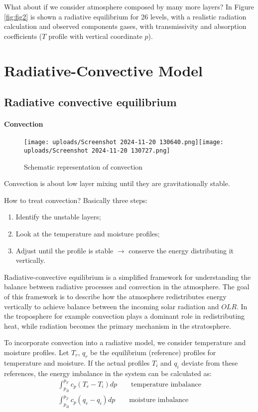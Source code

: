 What about if we consider atmosphere composed by many more layers?
In Figure \ref{fig:fig2} is shown a radiative equilibrium for 26 levels, with a realistic radiation calculation and observed components gases, with transmissivity and absorption coefficients ($T$ profile with vertical coordinate $p$).

\section{Radiative-Convective Model}
\subsection{Radiative convective equilibrium}\label{subsec:convection adjustments}
\paragraph{Convection}
\begin{figure}[htpb]
	\centering
	\texttt{[image: uploads/Screenshot 2024-11-20 130640.png]}\quad \texttt{[image: uploads/Screenshot 2024-11-20 130727.png]}
	\caption{Schematic representation of convection}

\end{figure}
Convection is about low layer mixing until they are gravitationally stable.

How to treat convection? Basically three steps:
\begin{enumerate}
	\item Identify the unstable layers;
	\item Look at the temperature and moisture profiles;
	\item Adjust until the profile is stable $\rightarrow$ conserve the energy distributing it vertically.
\end{enumerate}
Radiative-convective equilibrium is a simplified framework for understanding the balance between radiative processes and convection in the atmosphere. The goal of this framework is to describe how the atmosphere redistributes energy vertically to achieve balance between the incoming solar radiation and $OLR$. In the troposphere for example convection plays a dominant role in redistributing heat, while radiation becomes the primary mechanism in the stratosphere.


To incorporate convection into a radiative model, we consider temperature and moisture profiles. Let  $T_r$, $q_r$ be the equilibrium (reference) profiles for temperature and moisture. If the actual profiles $T_i$ and $q_i$ deviate from these references, the energy imbalance in the system can be calculated as:
\begin{align*}
	\int_{p_B}^{p_T}c_p(T_r-T_i)dp \qquad \text{temperature imbalance} \\
	\int_{p_B}^{p_T}c_p(q_r-q_i)dp \qquad \text{moisture imbalance}
\end{align*}

